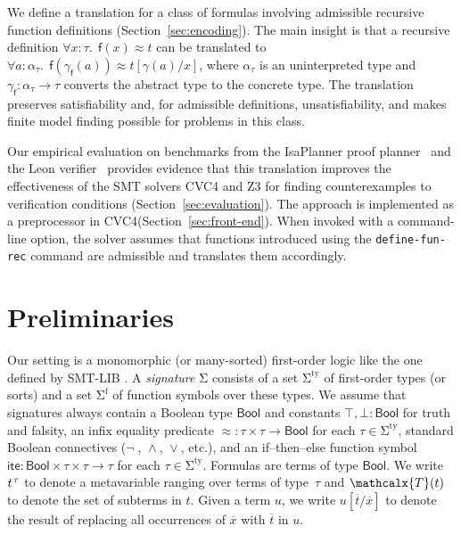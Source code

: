 \documentclass[runningheads,a4paper]{llncs}
\newcommand{\con}[1]{\mathsf{#1}}
\let\const=\con
\renewcommand\vec[1]{\overline{#1}}
\let\oldSigma=\Sigma
\def\Sigma{\mathrm{\oldSigma}}
\let\oldneg=\neg
\def\neg{\oldneg\;}
\let\oldvee=\vee
\def\vee{\mathrel{\oldvee}}
\let\oldwedge=\wedge
\def\wedge{\mathrel{\oldwedge}}
\newcommand\cvc{CVC4\xspace}
\newcommand\ziii{Z3\xspace}
\newcommand{\teq}{\approx}
\newcommand{\terms}{\mathcalx{T}}
\newcommand{\stypes}[1]{#1^\mathrm{ty}}
\newcommand{\sfuns}[1]{#1^\mathrm{f}}
\newcommand\ty[1]{\con{#1}}
\newcommand{\Bool}{\ty{Bool}}
\newcommand{\ltrue}{\top}
\newcommand{\lfalse}{\bot}
\newcommand{\lite}{\con{ite}}
\newcommand\concret{\gamma} %
\newcommand{\farg}[1]{\concret_{#1}}
\newcommand{\fargtype}[1]{\alpha_{#1}}
\newcommand{\rem}[1]{\textcolor{red}{[#1]}}
\newcommand{\jb}[1]{\rem{#1 --jb}}
\newcommand{\ct}[1]{\rem{#1 --ct}}
\newcommand{\vthinspace}{\kern+0.083333em}
\newcommand{\typ}[1]{^{\vthinspace #1}}
\begin{document}
We define a translation for a class of
formulas involving admissible recursive function definitions
(Section~\ref{sec:encoding}). The main insight is that a
recursive definition $\forall x : \tau.\;\, \const{f}(x) \teq t$
can be translated to
$\forall a :
\fargtype{\tau}.\;\, \const{f}(\farg{\con{f}}(a)) \teq t[\concret(a)/x]$, where
$\fargtype{\tau}$ is an uninterpreted  type and $\farg{\con{f}} :
\fargtype{\tau} \to \tau$ converts the abstract type to the concrete
type. The translation preserves satisfiability and, for admissible definitions,
unsatisfiability, and makes finite model finding possible for problems in this
class.

Our empirical evaluation on benchmarks from the IsaPlanner proof planner~\cite{DBLP:conf/itp/JohanssonDB10}
and the Leon verifier~\cite{blanc2013overview} provides
evidence that this translation improves the effectiveness of the SMT solvers
\cvc and \ziii for finding counterexamples to verification conditions
(Section~\ref{sec:evaluation}). The approach is implemented as a preprocessor
in \cvc (Section~\ref{sec:front-end}). When invoked with a
command-line option, the solver assumes that functions introduced using the
\texttt{define-fun-rec} command are admissible and translates them accordingly.


\section{Preliminaries}
\label{sec:prelim}

Our setting is a monomorphic (or many-sorted) first-order logic
like the one defined by SMT-LIB \cite{smtlib25}.
A \emph{signature} $\Sigma$ consists of
a set $\stypes{\Sigma}$ of %
first-order types
%
(or sorts) and a set $\sfuns{\Sigma}$ of function symbols over these types.
We assume that signatures always contain a Boolean type $\Bool$ and constants
$\ltrue, \lfalse : \Bool$ for truth and falsity,
an infix equality predicate ${\teq} : \tau \times \tau \to \Bool$
for each $\tau \in \stypes{\Sigma}$,
standard Boolean connectives ($\neg$, $\wedge$, $\vee$, etc.),
and an if--then--else function symbol
$\lite : \Bool \times \tau \times \tau \rightarrow \tau$
for each $\tau \in \stypes{\Sigma}$.
Formulas are terms of type $\Bool$.
We write $t\typ{\tau}$ to denote a metavariable ranging over terms of
type~$\tau$ and $\terms( t )$ to denote the set of subterms in $t$.
Given a term $u$, we write $u[\vec t/\vec x]$ to denote the result of replacing
all occurrences of $\vec x$ with $\vec t$ in $u$.
\end{document}
